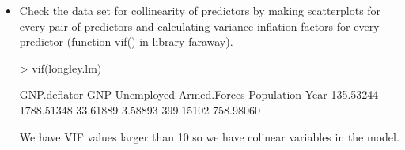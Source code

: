 \documentclass[a4paper]{article}
\begin{document}
\begin{itemize}
\item Check the data set for collinearity of predictors by making scatterplots
for every pair of predictors and calculating variance inflation factors for every predictor (function vif() in library faraway).
\begin{Schunk}
\begin{Sinput}
> vif(longley.lm)	
\end{Sinput}
\begin{Soutput}
GNP.deflator          GNP   Unemployed Armed.Forces   Population         Year 
   135.53244   1788.51348     33.61889      3.58893    399.15102    758.98060 
\end{Soutput}
\end{Schunk}
We have VIF values larger than 10 so we have colinear variables in the model.


\end{itemize}
\end{document}
